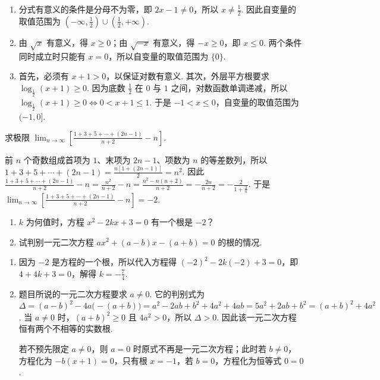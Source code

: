 \begin{solution}
\begin{enumerate}
  \item 分式有意义的条件是分母不为零，即 \(2x-1\neq0\)，所以 \(x\neq\frac12\). 因此自变量的取值范围为 \(\left(-\infty,\frac12\right)\cup\left(\frac12,+\infty\right)\).
  \item 由 \(\sqrt{x}\) 有意义，得 \(x\geqslant0\)；由 \(\sqrt{-x}\) 有意义，得 \(-x\geqslant0\)，即 \(x\leqslant0\). 两个条件同时成立时只能有 \(x=0\)，所以自变量的取值范围为 \(\{0\}\).
  \item 首先，必须有 \(x+1>0\)，以保证对数有意义. 其次，外层平方根要求 \(\log_{\frac12}(x+1)\geqslant0\). 因为底数 \(\frac12\) 在 \(0\) 与 \(1\) 之间，对数函数单调递减，所以 \(\log_{\frac12}(x+1)\geqslant0\Longleftrightarrow 0<x+1\leqslant1\). 于是 \(-1<x\leqslant0\)，自变量的取值范围为 \((-1,0]\).
\end{enumerate}
\end{solution}

\begin{problem}
求极限 \(\displaystyle\lim_{n\to\infty}\left[\frac{1+3+5+\cdots+(2n-1)}{n+2}-n\right]\).
\end{problem}

\begin{solution}
前 \(n\) 个奇数组成首项为 \(1\)、末项为 \(2n-1\)、项数为 \(n\) 的等差数列，所以 \(1+3+5+\cdots+(2n-1)=\frac{n[1+(2n-1)]}{2}=n^2\). 因此
\(\frac{1+3+5+\cdots+(2n-1)}{n+2}-n=\frac{n^2}{n+2}-n=\frac{n^2-n(n+2)}{n+2}=-\frac{2n}{n+2}=-\frac{2}{1+\frac2n}\). 于是 \(\displaystyle\lim_{n\to\infty}\left[\frac{1+3+5+\cdots+(2n-1)}{n+2}-n\right]=-2\).
\end{solution}

\begin{problem}
\begin{enumerate}
  \item \(k\) 为何值时，方程 \(x^{2}-2kx+3=0\) 有一个根是 \(-2\)？
  \item 试判别一元二次方程 \(ax^{2}+(a-b)x-(a+b)=0\) 的根的情况.
\end{enumerate}
\end{problem}

\begin{solution}
\begin{enumerate}
  \item 因为 \(-2\) 是方程的一个根，所以代入方程得 \((-2)^2-2k(-2)+3=0\)，即 \(4+4k+3=0\)，解得 \(k=-\frac74\).
  \item 题目所说的一元二次方程要求 \(a\neq0\). 它的判别式为 \(\Delta=(a-b)^2-4a\bigl(-(a+b)\bigr)=a^2-2ab+b^2+4a^2+4ab=5a^2+2ab+b^2=(a+b)^2+4a^2\). 当 \(a\neq0\) 时，\((a+b)^2\geqslant0\) 且 \(4a^2>0\)，所以 \(\Delta>0\). 因此该一元二次方程恒有两个不相等的实数根.

  若不预先限定 \(a\neq0\)，则 \(a=0\) 时原式不再是一元二次方程；此时若 \(b\neq0\)，方程化为 \(-b(x+1)=0\)，只有根 \(x=-1\)，若 \(b=0\)，方程化为恒等式 \(0=0\).
\end{enumerate}
\end{solution}

